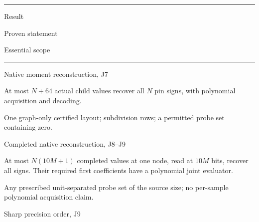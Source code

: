 \documentclass[11pt,a4paper]{article}
\newlength{\OfflineResearchTableWidth}
\newcommand{\OfflineResearchHeaderRule}{\noindent\rule{\linewidth}{0.45pt}\par}
\newcommand{\OfflineResearchRow}{\par}
\newenvironment{OfflineResearchTable}{%
  \par\medskip\begingroup\small\setlength{\parindent}{0pt}%
  \setlength{\parskip}{3pt plus 1pt minus .5pt}%
  \setlength{\OfflineResearchTableWidth}{\linewidth}%
}{%
  \par\endgroup\medskip%
}
\begin{document}
\begin{OfflineResearchTable}
\OfflineResearchHeaderRule
\noindent%
\begin{minipage}[t]{0.31500\OfflineResearchTableWidth}\raggedright
Result
\end{minipage}\hfill%
\begin{minipage}[t]{0.31500\OfflineResearchTableWidth}\raggedright
Proven statement
\end{minipage}\hfill%
\begin{minipage}[t]{0.31500\OfflineResearchTableWidth}\raggedright
Essential scope
\end{minipage}%
\OfflineResearchRow
\nobreak
\OfflineResearchHeaderRule
\nobreak
\noindent%
\begin{minipage}[t]{0.31500\OfflineResearchTableWidth}\raggedright
Native moment reconstruction, J7
\end{minipage}\hfill%
\begin{minipage}[t]{0.31500\OfflineResearchTableWidth}\raggedright
At most \(N+64\) actual child values
recover all \(N\) pin signs, with polynomial acquisition and decoding.
\end{minipage}\hfill%
\begin{minipage}[t]{0.31500\OfflineResearchTableWidth}\raggedright
One graph-only certified layout; subdivision rows; a permitted probe set
containing zero.
\end{minipage}%
\OfflineResearchRow
\noindent%
\begin{minipage}[t]{0.31500\OfflineResearchTableWidth}\raggedright
Completed native reconstruction, J8--J9
\end{minipage}\hfill%
\begin{minipage}[t]{0.31500\OfflineResearchTableWidth}\raggedright
At most \(N(10M+1)\) completed
values at one node, read at \(10M\) bits, recover all signs. Their
required first coefficients have a polynomial joint evaluator.
\end{minipage}\hfill%
\begin{minipage}[t]{0.31500\OfflineResearchTableWidth}\raggedright
Any
prescribed unit-separated probe set of the source size; no per-sample
polynomial acquisition claim.
\end{minipage}%
\OfflineResearchRow
\noindent%
\begin{minipage}[t]{0.31500\OfflineResearchTableWidth}\raggedright
Sharp precision order, J9
\end{minipage}\hfill%
\begin{minipage}[t]{0.31500\OfflineResearchTableWidth}\raggedright

\end{minipage}
\end{OfflineResearchTable}
\end{document}
